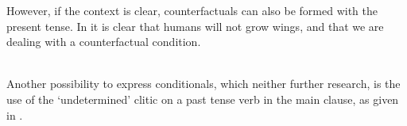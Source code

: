However, if the context is clear, counterfactuals can also be formed with the present tense. In   it is clear that humans will not grow wings, and that we are dealing with a counterfactual condition.

 \\
%
%
Another possibility to express conditionals, which neither further research, is the use of the `undetermined' clitic on a past tense verb in the main clause, as given in .

 \\




